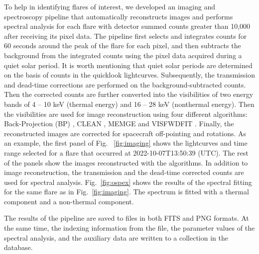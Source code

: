 \documentclass[referee]{aa} %
\begin{document}
To help in identifying flares of interest, we developed an imaging and spectroscopy pipeline that automatically reconstructs images and performs spectral analysis for each flare with detector summed counts greater than 10,000
after receiving its pixel data. 
The pipeline first selects and integrates counts for 60 seconds around the peak of the flare for each pixel, and then subtracts the background from the integrated counts using the pixel data acquired during a quiet solar period. It is worth mentioning that quiet solar periods are determined on the basis of counts in the quicklook lightcurves. 
Subsequently, the transmission and dead-time corrections are performed on the background-subtracted counts. Then the corrected counts are further converted into the visibilities of two energy bands of 4 -- 10 keV (thermal energy) and 16 -- 28 keV (nonthermal energy). 
Then the visibilities are used for image reconstruction using four different algorithms: Back-Projection (BP) \citep{paolo2022}, CLEAN \citep{clean}, MEM\textunderscore GE \citep{mem, memge} and VIS\textunderscore FWDFIT \citep{visfwd}. Finally, the reconstructed images are corrected for spacecraft off-pointing and rotations. 
As an example,  the first panel of Fig. ~\ref{fig:imaging} shows the lightcurves and time range selected for a flare that occurred at 2022-10-07T13:50:39 (UTC). 
The rest of the panels show the images reconstructed with the algorithms. 
In addition to image reconstruction, the transmission and the dead-time corrected counts are used for spectral analysis. Fig.~\ref{fig:ospex} shows the results of the spectral fitting for the same flare as in Fig.~\ref{fig:imaging}. The spectrum is fitted with a thermal component and a non-thermal component. 

The results of the pipeline are saved to files in both FITS and PNG formats. At the same time, the indexing information from the file, the parameter values of the spectral analysis, and the auxiliary data are written to a collection in the database. 
\end{document}
